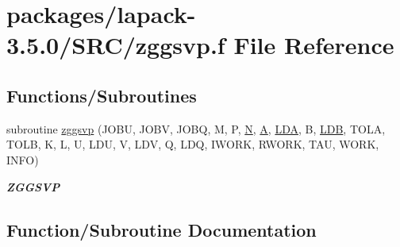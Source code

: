 \hypertarget{zggsvp_8f}{}\section{packages/lapack-\/3.5.0/\+S\+R\+C/zggsvp.f File Reference}
\label{zggsvp_8f}
\subsection*{Functions/\+Subroutines}
\begin{DoxyCompactItemize}
\item 
subroutine \hyperlink{zggsvp_8f_ae323e6f14bf3340535db86d521737174}{zggsvp} (J\+O\+B\+U, J\+O\+B\+V, J\+O\+B\+Q, M, P, \hyperlink{polmisc_8c_a0240ac851181b84ac374872dc5434ee4}{N}, \hyperlink{classA}{A}, \hyperlink{example__user_8c_ae946da542ce0db94dced19b2ecefd1aa}{L\+D\+A}, B, \hyperlink{example__user_8c_a50e90a7104df172b5a89a06c47fcca04}{L\+D\+B}, T\+O\+L\+A, T\+O\+L\+B, K, L, U, L\+D\+U, V, L\+D\+V, Q, L\+D\+Q, I\+W\+O\+R\+K, R\+W\+O\+R\+K, T\+A\+U, W\+O\+R\+K, I\+N\+F\+O)
\begin{DoxyCompactList}\small\item\em {\bfseries Z\+G\+G\+S\+V\+P} \end{DoxyCompactList}\end{DoxyCompactItemize}


\subsection{Function/\+Subroutine Documentation}
\hypertarget{zggsvp_8f_ae323e6f14bf3340535db86d521737174}{}
